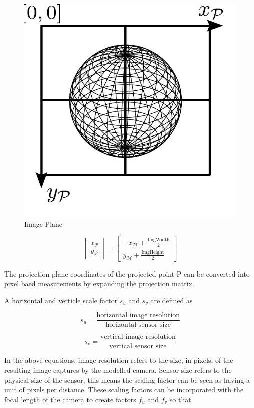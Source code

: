 \begin{figure}[H]
    \centering
    \includegraphics[width=0.5\linewidth]{figures/imageprocessing/ImagePlane.pdf}
    \caption{Image Plane}
    \label{fig4.2}
\end{figure}

\begin{equation}
\begin{bmatrix}
x_\mathcal{P} \\
y_\mathcal{P}
\end{bmatrix}
=
\begin{bmatrix}
    -x_\mathcal{M} + \frac{\text{ImgWidth}}{2} \\
    y_\mathcal{M} + \frac{\text{ImgHeight}}{2}
\end{bmatrix}
\end{equation}



The projection plane coordinates of the projected point P can be converted into pixel baed measurements by expanding the projection matrix.

A horizontal and verticle scale factor $s_u$ and $s_v$ are defined as 


\begin{equation}
    s_u = \frac{\text{horizontal image resolution}}{\text{horizontal sensor size}}
\end{equation}

\begin{equation}
    s_v = \frac{\text{vertical image resolution}}{\text{vertical sensor size}}
\end{equation}

In the above equations, image resolution refers to the size, in pixels, of the resulting image captures by the modelled camera. Sensor size refers to the physical
size of the sensor, this means the scaling factor can be seen as having a unit of pixels per distance. These scaling factors can be incorporated with the focal length
of the camera to create factors $f_u$ and $f_v$ so that

